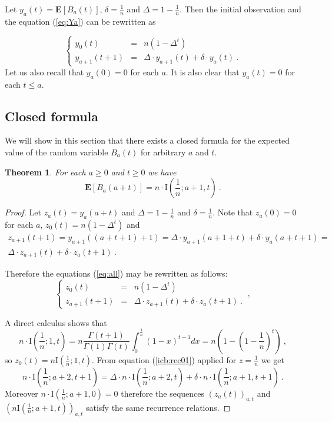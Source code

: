 \documentclass[submission]{dmtcs}
\newtheorem{theorem}{Theorem}
\newcommand{\E}[1]{\mathbf{E}\left[#1\right]}
\newcommand{\IBETAREGn}[2]{\mathrm{I}\left(\frac1n;#1,#2\right)}
\begin{document}
Let $y_a(t) = \E{B_{a}(t)}$, $\delta=\frac{1}{n}$ and $\Delta = 1 - \frac{1}{n}$. 
Then the initial observation and the equation (\ref{eq:Ya}) can be rewritten as

\begin{equation}
\label{eq:all}
\left\{
\begin{array}{rcl}
y_{0}(t)     &=& n (1 - \Delta^t)\\
y_{a+1}(t+1) &=& \Delta\cdot y_{a+1}(t) + \delta\cdot y_{a}(t)~.
\end{array}
\right.
\end{equation}
%
Let us also recall that $y_{a}(0)=0$ for each $a$.
It is also clear  that $y_{a}(t)=0$ for each $t\leq a$.


\subsection{Closed formula}

We will show in this section that there exists a closed formula for
the expected value of the random variable $B_{a}(t)$ for arbitrary $a$ and $t$.

\begin{theorem} 
\label{thm:IBF}
For each $a\geq 0$ and $t\geq 0$ we have
$$
  \E{B_{a}(a+t)} = n \cdot \IBETAREGn{a+1}{t} ~.
$$
\end{theorem}

\begin{proof}
Let $z_a(t) = y_a(a+t)$ and $\Delta = 1 - \frac1n$ and $\delta = \frac1n$.
Note that $z_{a}(0) = 0$ for each $a$, 
$z_{0}(t) =  n(1 - \Delta^t)$ and
\begin{gather*}
z_{a+1}(t+1) = y_{a+1}((a+t+1)+1) =
\Delta \cdot y_{a+1}(a+1+t)  + \delta \cdot y_{a}(a+t+1) = \\
\Delta\cdot z_{a+1}(t) + \delta\cdot z_{a}(t+1)~.
\end{gather*}

Therefore the equations (\ref{eq:all}) may be rewritten
as follows:
\begin{equation}
\label{eq:allX}
\left\{
\begin{array}{rcl}
z_{0}(t)   &=& n(1 - \Delta^t)\\
z_{a+1}(t+1) &=& \Delta\cdot z_{a+1}(t) + \delta\cdot z_{a}(t+1)~.
\end{array}
\right. ~,
\end{equation}

A direct calculus shows that
$$
n \cdot \IBETAREGn{1}{t} =  n \frac{\Gamma(t+1)}{\Gamma(1)\Gamma(t)} \int_{0}^{\frac1n} (1-x)^{t-1} dx = 
n \left(1- \left(1-\frac1n\right)^t\right) ~,
$$
so $z_0(t) = n \IBETAREGn{1}{t}$.
From equation (\ref{icb:rec01}) applied for $z=\frac1n$
we get 
\begin{equation}
   n \cdot \IBETAREGn{a+2}{t+1} = 
   \Delta \cdot n \cdot \IBETAREGn{a+2}{t} +\delta\cdot n \cdot \IBETAREGn{a+1}{t+1} ~.
\end{equation}
Moreover  $n \cdot \IBETAREGn{a+1}{0} = 0$
therefore the sequences $(z_a(t))_{a,t}$ and $(n \IBETAREGn{a+1}{t})_{a,t}$ 
satisfy the same recurrence relations.
\end{proof}
\end{document}
